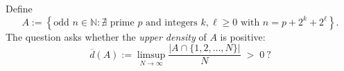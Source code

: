 Define
\[
A:=\left\{\text{odd }n\in\mathbb{N}: \nexists\text{ prime }p\text{ and integers }k,\ell\ge 0\text{ with } n=p+2^k+2^\ell\right\}.
\]
The question asks whether the \emph{upper density} of $A$ is positive:
\[
\overline{d}(A):=\limsup_{N\to\infty}\frac{|A\cap\{1,2,\dots,N\}|}{N} \;>\;0\ ?
\]
